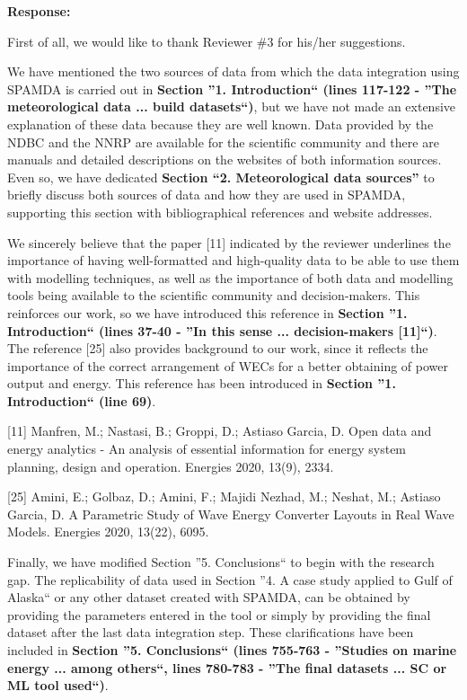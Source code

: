 \documentclass[a4paper,twoside,11pt]{article}
\begin{document}
\textbf{Response:}
{
First of all, we would like to thank Reviewer \#3 for his/her suggestions.

We have mentioned the two sources of data from which the data integration using SPAMDA is carried out in \textbf{Section ''1. Introduction`` (lines 117-122 - ''The meteorological data ... build datasets``)}, but we have not made an extensive explanation of these data because they are well known. Data provided by the NDBC and the NNRP are available for the scientific community and there are manuals and detailed descriptions on the websites of both information sources. Even so, we have dedicated \textbf{Section ``2. Meteorological data sources''} to briefly discuss both sources of data and how they are used in SPAMDA, supporting this section with bibliographical references and website addresses. 

We sincerely believe that the paper [11] indicated by the reviewer underlines the importance of having well-formatted and high-quality data to be able to use them with modelling techniques, as well as the importance of both data and modelling tools being available to the scientific community and decision-makers. This reinforces our work, so we have introduced this reference in \textbf{Section ''1. Introduction`` (lines 37-40 - ''In this sense ... decision-makers
[11]``)}. The reference [25] also provides background to our work, since it reflects the importance of the correct arrangement of WECs for a better obtaining of power output and energy. This reference has been introduced in \textbf{Section ''1. Introduction`` (line 69)}.

[11] Manfren, M.; Nastasi, B.; Groppi, D.; Astiaso Garcia, D. Open data and energy analytics - An analysis of essential information for energy system planning, design and operation. Energies 2020, 13(9), 2334.

[25] Amini, E.; Golbaz, D.; Amini, F.; Majidi Nezhad, M.; Neshat, M.; Astiaso Garcia, D. A Parametric Study of Wave Energy Converter Layouts in Real Wave Models. Energies 2020, 13(22), 6095.

Finally, we have modified Section ''5. Conclusions`` to begin with the research gap. The replicability of data used in Section ''4. A case study applied to Gulf of Alaska`` or any other dataset created with SPAMDA, can be obtained by providing the parameters entered in the tool or simply by providing the final dataset after the last data integration step. These clarifications have been included in \textbf{Section ''5. Conclusions`` (lines 755-763 - ''Studies on marine energy ... among others``, lines 780-783 - ''The final datasets ... SC or ML tool used``)}.

}
\end{document}
